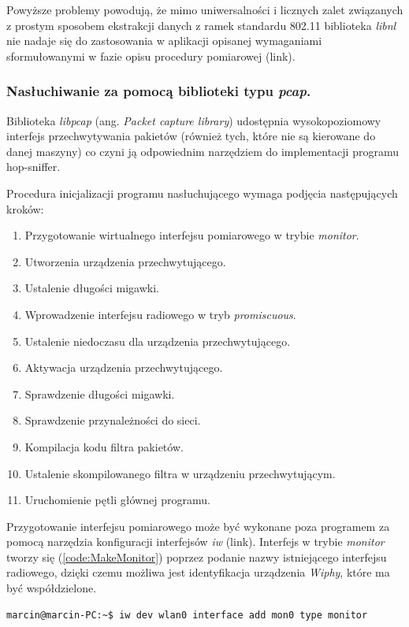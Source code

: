 Powyższe problemy powodują, że mimo uniwersalności i licznych zalet związanych z prostym sposobem ekstrakcji danych z ramek standardu 802.11 biblioteka \emph{libnl} nie nadaje się do zastosowania w aplikacji opisanej wymaganiami sformułowanymi w fazie opisu procedury pomiarowej (link). 

\subsubsection{Nasłuchiwanie za pomocą biblioteki typu \emph{pcap}.}

Biblioteka \emph{libpcap} (ang. \emph{Packet capture library}) udostępnia wysokopoziomowy interfejs przechwytywania pakietów (również tych, które nie są kierowane do danej maszyny) co czyni ją odpowiednim narzędziem do implementacji programu hop-sniffer. 

Procedura inicjalizacji programu nasłuchującego wymaga podjęcia następujących kroków:
\begin{enumerate}
\item Przygotowanie wirtualnego interfejsu pomiarowego w trybie \emph{monitor}.
\item Utworzenia urządzenia przechwytującego.
\item Ustalenie długości migawki.
\item Wprowadzenie interfejsu radiowego w tryb \emph{promiscuous}.
\item Ustalenie niedoczasu dla urządzenia przechwytującego.
\item Aktywacja urządzenia przechwytującego.
\item Sprawdzenie długości migawki.
\item Sprawdzenie przynależności do sieci.
\item Kompilacja kodu filtra pakietów.
\item Ustalenie skompilowanego filtra w urządzeniu przechwytującym.
\item Uruchomienie pętli głównej programu.
\end{enumerate}

Przygotowanie interfejsu pomiarowego może być wykonane poza programem za pomocą narzędzia konfiguracji interfejsów \emph{iw} (link). Interfejs w trybie \emph{monitor} tworzy się (\ref{code:MakeMonitor}) poprzez podanie nazwy istniejącego interfejsu radiowego, dzięki czemu możliwa jest identyfikacja urządzenia \emph{Wiphy}, które ma być współdzielone. 

\begin{lstlisting}[frame=tb]
marcin@marcin-PC:~$ iw dev wlan0 interface add mon0 type monitor
\end{lstlisting}

